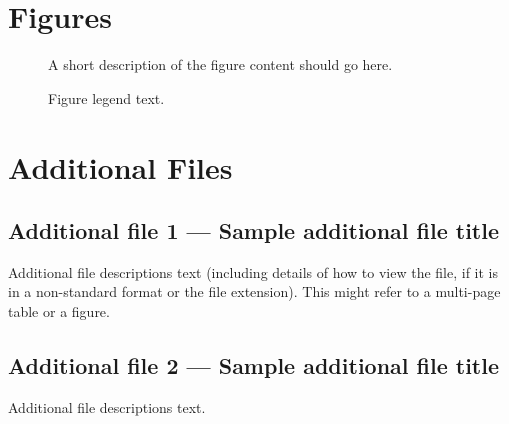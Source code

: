 \documentclass[twocolumn]{bmcart}%
\begin{document}
\begin{backmatter}


\section*{Figures}
  \begin{figure}[h!]
  \caption{
      A short description of the figure content
      should go here.}
      \end{figure}

\begin{figure}[h!]
  \caption{
      Figure legend text.}
      \end{figure}



\section*{Additional Files}
  \subsection*{Additional file 1 --- Sample additional file title}
    Additional file descriptions text (including details of how to
    view the file, if it is in a non-standard format or the file extension).  This might
    refer to a multi-page table or a figure.

  \subsection*{Additional file 2 --- Sample additional file title}
    Additional file descriptions text.


\end{backmatter}
\end{document}
